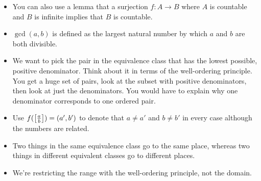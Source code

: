 \documentclass[titlepage]{report}
\begin{document}
\begin{itemize}
    \item You can also use a lemma that a surjection $f:A\to B$ where $A$ is countable and $B$ is infinite implies that $B$ is countable.
    \item $\gcd(a,b)$ is defined as the largest natural number by which $a$ and $b$ are both divisible.
    \item We want to pick the pair in the equivalence class that has the lowest possible, positive denominator. Think about it in terms of the well-ordering principle. You get a huge set of pairs, look at the subset with positive denominators, then look at just the denominators. You would have to explain why one denominator corresponds to one ordered pair.
    \item Use $f(\left[ \frac{a}{b} \right])=(a',b')$ to denote that $a\neq a'$ and $b\neq b'$ in every case although the numbers are related.
    \item Two things in the same equivalence class go to the same place, whereas two things in different equivalent classes go to different places.
    \item We're restricting the range with the well-ordering principle, not the domain.
\end{itemize}




\end{document}
